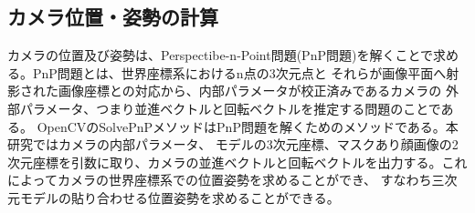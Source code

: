 \documentclass[]{jarticle}          %
\begin{document}
\subsection{カメラ位置・姿勢の計算}
カメラの位置及び姿勢は、Perspectibe-n-Point問題(PnP問題)を解くことで求める。PnP問題とは、世界座標系におけるn点の3次元点と
それらが画像平面へ射影された画像座標との対応から、内部パラメータが校正済みであるカメラの
外部パラメータ、つまり並進ベクトルと回転ベクトルを推定する問題のことである\cite{bib_2}。
OpenCVのSolvePnPメソッドはPnP問題を解くためのメソッドである。本研究ではカメラの内部パラメータ、
モデルの3次元座標、マスクあり顔画像の2次元座標を引数に取り、カメラの並進ベクトルと回転ベクトルを出力する。これによってカメラの世界座標系での位置姿勢を求めることができ、
すなわち三次元モデルの貼り合わせる位置姿勢を求めることができる。
\newpage
\end{document}
